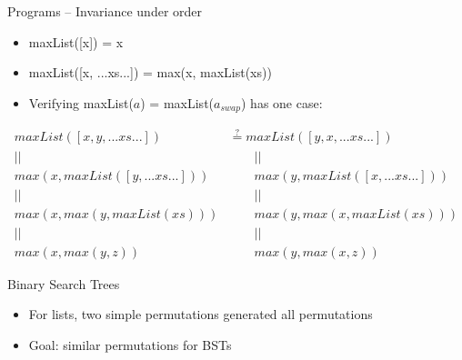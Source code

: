 \documentclass[usenames,dvipsnames]{beamer}
\begin{document}
\begin{frame}[fragile]{Programs -- Invariance under order}
  \begin{itemize}
    \item maxList([x]) = x
    \item maxList([x, ...xs...]) = max(x, maxList(xs))
  \end{itemize}
  \vfill
  \begin{itemize}
    \item Verifying maxList($a$) = maxList($a_{swap}$) has one case:
  \end{itemize}
  \begin{align*}
    maxList([x, y, ...xs...])
      & \stackrel{?}{=}
    maxList([y, x, ...xs...])
    \\ || \qquad & \qquad || \\
    max(x, maxList([y, ...xs...]))
      & \qquad
    max(y, maxList([x, ...xs...]))
    \\ || \qquad & \qquad || \\
    max(x, max(y, maxList(xs)))
      & \qquad
    max(y, max(x, maxList(xs)))
    \\ || \qquad & \qquad || \\
    max(x, max(y, z))
      & \qquad
    max(y, max(x, z))
  \end{align*}
\end{frame}

\begin{frame}[fragile]{Binary Search Trees}
  \begin{itemize}
    \item For lists, two simple permutations generated all permutations
    \item Goal: similar permutations for BSTs
  \end{itemize}
\end{frame}
\end{document}
